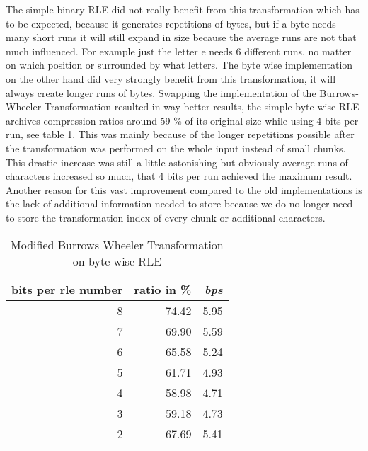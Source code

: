 \par{
The simple binary RLE did not really benefit from this transformation which has to be expected, because it generates repetitions of bytes, but if a byte needs many short runs it will still expand in size because the average runs are not that much influenced. For example just the letter e needs 6 different runs, no matter on which position or surrounded by what letters. The byte wise implementation on the other hand did very strongly benefit from this transformation, it will always create longer runs of bytes. Swapping the implementation of the Burrows-Wheeler-Transformation resulted in way better results, the simple byte wise RLE archives compression ratios around 59 \% of its original size while using 4 bits per run, see table \ref{tab:t13 Modified Burrows Wheeler Transformation on byte wise RLE}. This was mainly because of the longer repetitions possible after the transformation was performed on the whole input instead of small chunks. This drastic increase was still a little astonishing but obviously average runs of characters increased so much, that 4 bits per run achieved the maximum result. Another reason for this vast improvement compared to the old implementations is the lack of additional information needed to store because we do no longer need to store the transformation index of every chunk or additional characters.
	\begin{table}[h]
		\centering
		\begin{tabular}{r|r|r}	
			bits per rle number & ratio in \% & \textit{bps}\\
			\hline
			8 & 74.42 & 5.95\\
			7 & 69.90 & 5.59\\
			6 & 65.58 & 5.24\\
			5 & 61.71 & 4.93\\
			4 & 58.98 & 4.71\\
			3 & 59.18 & 4.73\\
			2 & 67.69 & 5.41
		\end{tabular}
		\caption{Modified Burrows Wheeler Transformation on byte wise RLE}
		\label{tab:t13 Modified Burrows Wheeler Transformation on byte wise RLE}
	\end{table}
}
